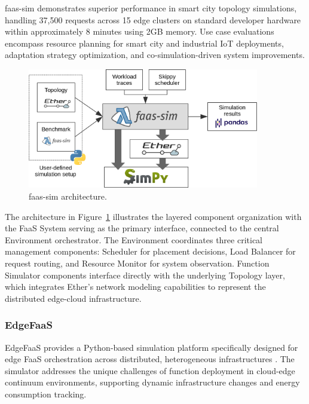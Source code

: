 faas-sim demonstrates superior performance in smart city topology simulations, handling 37,500 requests across 15 edge clusters on standard developer hardware within approximately 8 minutes using 2GB memory. Use case evaluations encompass resource planning for smart city and industrial IoT deployments, adaptation strategy optimization, and co-simulation-driven system improvements.

\begin{figure}[htbp]
\centering
\includegraphics[width=0.9\textwidth]{assets/faas-sim arch.png}
\caption{faas-sim architecture\cite{boughzala2022faassim}.}
\label{fig:faas-sim-architecture}
\end{figure}

The architecture in Figure~\ref{fig:faas-sim-architecture} illustrates the layered component organization with the FaaS System serving as the primary interface, connected to the central Environment orchestrator. The Environment coordinates three critical management components: Scheduler for placement decisions, Load Balancer for request routing, and Resource Monitor for system observation. Function Simulator components interface directly with the underlying Topology layer, which integrates Ether's network modeling capabilities to represent the distributed edge-cloud infrastructure.


\subsubsection{EdgeFaaS}

EdgeFaaS provides a Python-based simulation platform specifically designed for edge FaaS orchestration across distributed, heterogeneous infrastructures \cite{li2022edgefaas}. The simulator addresses the unique challenges of function deployment in cloud-edge continuum environments, supporting dynamic infrastructure changes and energy consumption tracking.


